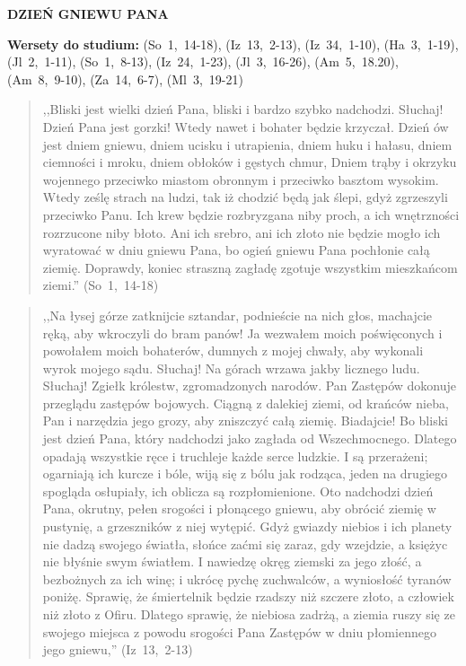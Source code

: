 \documentclass[10pt,a4paper,oneside]{article}
\begin{document}
\centerline{\textbf{\MakeUppercase{Dzień gniewu Pana}}}
\begin{center}
\textbf{Wersety do studium:} \mbox{(So 1, 14-18)}, \mbox{(Iz 13, 2-13)}, \mbox{(Iz 34, 1-10)}, \mbox{(Ha 3, 1-19)}, \mbox{(Jl 2, 1-11)}, \mbox{(So 1, 8-13)}, \mbox{(Iz 24, 1-23)}, \mbox{(Jl 3, 16-26)}, \mbox{(Am 5, 18.20)}, \mbox{(Am 8, 9-10)}, \mbox{(Za 14, 6-7)}, \mbox{(Ml 3, 19-21)}
\end{center}
\begin{quote}
,,Bliski jest wielki dzień Pana, bliski i bardzo szybko nadchodzi. Słuchaj! Dzień Pana jest gorzki! Wtedy nawet i bohater będzie krzyczał. Dzień ów jest dniem gniewu, dniem ucisku i utrapienia, dniem huku i hałasu, dniem ciemności i mroku, dniem obłoków i gęstych chmur, Dniem trąby i okrzyku wojennego przeciwko miastom obronnym i przeciwko basztom wysokim. Wtedy ześlę strach na ludzi, tak iż chodzić będą jak ślepi, gdyż zgrzeszyli przeciwko Panu. Ich krew będzie rozbryzgana niby proch, a ich wnętrzności rozrzucone niby błoto. Ani ich srebro, ani ich złoto nie będzie mogło ich wyratować w dniu gniewu Pana, bo ogień gniewu Pana pochłonie całą ziemię. Doprawdy, koniec straszną zagładę zgotuje wszystkim mieszkańcom ziemi.'' \mbox{(So 1, 14-18)}
\end{quote}
\begin{quote}
,,Na łysej górze zatknijcie sztandar, podnieście na nich głos, machajcie ręką, aby wkroczyli do bram panów! Ja wezwałem moich poświęconych i powołałem moich bohaterów, dumnych z mojej chwały, aby wykonali wyrok mojego sądu. Słuchaj! Na górach wrzawa jakby licznego ludu. Słuchaj! Zgiełk królestw, zgromadzonych narodów. Pan Zastępów dokonuje przeglądu zastępów bojowych. Ciągną z dalekiej ziemi, od krańców nieba, Pan i narzędzia jego grozy, aby zniszczyć całą ziemię. Biadajcie! Bo bliski jest dzień Pana, który nadchodzi jako zagłada od Wszechmocnego. Dlatego opadają wszystkie ręce i truchleje każde serce ludzkie. I są przerażeni; ogarniają ich kurcze i bóle, wiją się z bólu jak rodząca, jeden na drugiego spogląda osłupiały, ich oblicza są rozpłomienione. Oto nadchodzi dzień Pana, okrutny, pełen srogości i płonącego gniewu, aby obrócić ziemię w pustynię, a grzeszników z niej wytępić. Gdyż gwiazdy niebios i ich planety nie dadzą swojego światła, słońce zaćmi się zaraz, gdy wzejdzie, a księżyc nie błyśnie swym światłem. I nawiedzę okręg ziemski za jego złość, a bezbożnych za ich winę; i ukrócę pychę zuchwalców, a wyniosłość tyranów poniżę. Sprawię, że śmiertelnik będzie rzadszy niż szczere złoto, a człowiek niż złoto z Ofiru. Dlatego sprawię, że niebiosa zadrżą, a ziemia ruszy się ze swojego miejsca z powodu srogości Pana Zastępów w dniu płomiennego jego gniewu,'' \mbox{(Iz 13, 2-13)}
\end{quote}
\end{document}
